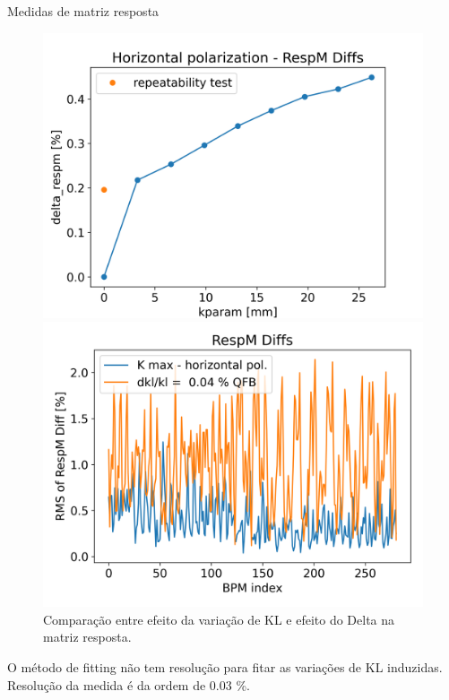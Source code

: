 \documentclass[1611]{beamer}					  %
\begin{document}
\begin{frame}{Medidas de matriz resposta}
  \begin{figure}[ht]
        \begin{minipage}[b]{0.45\linewidth}
            \centering
            \includegraphics[width=\textwidth]{2024-04-19/figures/repeatability.png}
            \caption{Comparação do efeito do Delta na matriz resposta com repetibilidade da medida.}
            \label{fig:a}
        \end{minipage}
        \hspace{0.5cm}
        \begin{minipage}[b]{0.45\linewidth}
            \centering
            \includegraphics[width=\textwidth]{2024-04-19/figures/Matrix_diff.png}
            \caption{Comparação entre efeito da variação de KL e efeito do Delta na matriz resposta.}
            \label{fig:b}
        \end{minipage}
   \end{figure}
O método de fitting não tem resolução para fitar as variações de KL induzidas. Resolução da medida é da ordem de 0.03 \%.
\end{frame}
\end{document}
